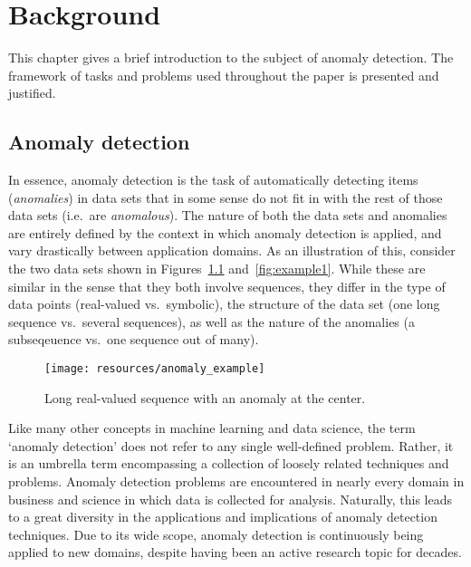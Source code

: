 \chapter{Background}
\label{ch:background}

This chapter gives a brief introduction to the subject of anomaly detection. The framework of tasks and problems used throughout the paper is presented and justified.

\section{Anomaly detection}
\label{sect:adb}

In essence, anomaly detection is the task of automatically detecting items (\emph{anomalies}) in data sets that in some sense do not fit in with the rest of those data sets (i.e.\ are \emph{anomalous}). The nature of both the data sets and anomalies are entirely defined by the context in which anomaly detection is applied, and vary drastically between application domains. As an illustration of this, consider the two data sets shown in Figures~\ref{fig:example2} and~\ref{fig:example1}. While these are similar in the sense that they both involve sequences, they differ in the type of data points (real-valued vs.\ symbolic), the structure of the data set (one long sequence vs.\ several sequences), as well as the nature of the anomalies (a subseqeuence vs.\ one sequence out of many).

\begin{figure}[htb]
    \centering
    \texttt{[image: resources/anomaly\_example]}
    \caption{\small Long real-valued sequence with an anomaly at the center.}
    \vspace{-0pt}
\label{fig:example2}
\end{figure}

Like many other concepts in machine learning and data science, the term `anomaly detection' does not refer to any single well-defined problem. Rather, it is an umbrella term encompassing a collection of loosely related techniques and problems. Anomaly detection problems are encountered in nearly every domain in business and science in which data is collected for analysis. Naturally, this leads to a great diversity in the applications and implications of anomaly detection techniques. Due to its wide scope, anomaly detection is continuously being applied to new domains, despite having been an active research topic for decades.

